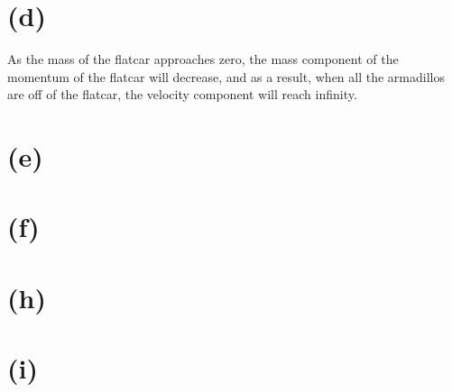 \documentclass[letterpaper]{article}
\begin{document}
\section{(d)}
\label{sec:org1084481}
As the mass of the flatcar approaches zero, the mass component of the momentum of the flatcar will decrease, and as a result, when all the armadillos are off of the flatcar, the velocity component will reach infinity.

\section{(e)}
\label{sec:org477a458}

\section{(f)}
\label{sec:org437788b}

\section{(h)}
\label{sec:org42826b7}

\section{(i)}
\label{sec:org48d1733}
\end{document}
